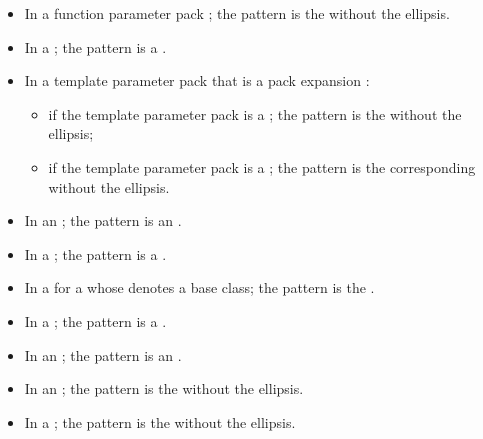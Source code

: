 \documentclass{wg21}
\begin{document}
\begin{itemize}
    \item In a function parameter pack ; the pattern is the
     without the ellipsis.

    \item In a  ;
    the pattern is a .

    \item In a template parameter pack that is a pack expansion :
    \begin{itemize}
        \item
        if the template parameter pack is a ;
        the pattern is the  without the ellipsis;

        \item
        if the template parameter pack is a ;
        the pattern is the corresponding 
        without the ellipsis.
    \end{itemize}

    \item In an  ;
    the pattern is an .

    \item In a  ;
    the pattern is a .

    \item In a   for a
     whose  denotes a
    base class; the pattern is the .

    \item In a  ;
    the pattern is a .

    \item In an  ; the pattern is
    an .

    \item In an  ; the pattern is
    the  without the ellipsis.

    \item In a  ; the pattern is
    the  without the ellipsis.


\end{itemize}
\end{document}
